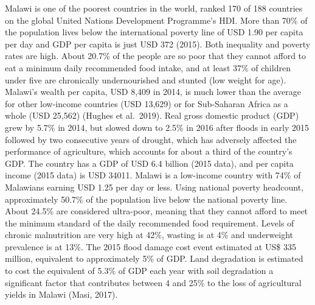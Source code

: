 \documentclass[
]{book}
\begin{document}
Malawi is one of the poorest countries in the world, ranked 170 of 188 countries on the global United Nations Development Programme's HDI. More than 70\% of the population lives below the international poverty line of USD 1.90 per capita per day and GDP per capita is just USD 372 (2015). Both inequality and poverty rates are high. About 20.7\% of the people are so poor that they cannot afford to eat a minimum daily recommended food intake, and at least 37\% of children under five are chronically undernourished and stunted (low weight for age). Malawi's wealth per capita, USD 8,409 in 2014, is much lower than the average for other low-income countries (USD 13,629) or for Sub-Saharan Africa as a whole (USD 25,562) (Hughes et al.~2019). Real gross domestic product (GDP) grew by 5.7\% in 2014, but slowed down to 2.5\% in 2016 after floods in early 2015 followed by two consecutive years of drought, which has adversely affected the performance of agriculture, which accounts for about a third of the country's GDP. The country has a GDP of USD 6.4 billion (2015 data), and per capita income (2015 data) is USD 34011. Malawi is a low-income country with 74\% of Malawians earning USD 1.25 per day or less. Using national poverty headcount, approximately 50.7\% of the population live below the national poverty line. About 24.5\% are considered ultra-poor, meaning that they cannot afford to meet the minimum standard of the daily recommended food requirement. Levels of chronic malnutrition are very high at 42\%, wasting is at 4\% and underweight prevalence is at 13\%. The 2015 flood damage cost event estimated at US\$ 335 million, equivalent to approximately 5\% of GDP. Land degradation is estimated to cost the equivalent of 5.3\% of GDP each year with soil degradation a significant factor that contributes between 4 and 25\% to the loss of agricultural yields in Malawi (Masi, 2017).
\end{document}
